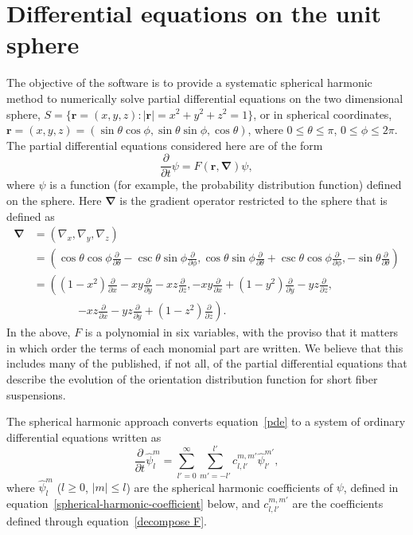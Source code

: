 \documentclass{amsart}
\newcommand\br{{\mathbf r}}
\newcommand\bnabla{{\boldsymbol \nabla}}
\begin{document}
\section{Differential equations on the unit sphere}

The objective of the software is to provide a systematic spherical harmonic method to numerically solve partial differential equations on the two
dimensional sphere, $S = \{\br = (x,y,z):|\br| = x^2+y^2+z^2 = 1\}$, or in spherical coordinates, $\br = (x,y,z) = (\sin\theta
\cos\phi,\sin\theta\sin\phi,\cos\theta)$, where $0\le\theta\le\pi$, $0\le\phi\le2\pi$.  The partial differential equations considered here are of the
form
\begin{equation}
\label{pde}
\frac\partial{\partial t}\psi = F(\br,\bnabla) \psi,
\end{equation}
where $\psi$ is a function (for example, the probability distribution function) defined on the sphere. Here $\bnabla$ is the gradient operator
restricted to the sphere that is defined as
\begin{equation}
\begin{split}
\bnabla &= (\nabla_x,\nabla_y,\nabla_z) \\
&= \left(\cos\theta\cos\phi\frac{\partial}{\partial\theta} - \csc\theta\sin\phi \frac{\partial}{\partial\phi},\cos\theta\sin\phi\frac{\partial}{\partial\theta} + \csc\theta\cos\phi \frac{\partial}{\partial\phi},-\sin\theta\frac{\partial}{\partial\theta} \right) \\
&= \left((1-x^2)\frac\partial{\partial x}-xy\frac\partial{\partial y}-xz\frac\partial{\partial z},
         -xy\frac\partial{\partial x}+(1-y^2)\frac\partial{\partial y}-yz\frac\partial{\partial z},\right.\\
&\qquad\qquad\left.
         -xz\frac\partial{\partial x}-yz\frac\partial{\partial y}+(1-z^2)\frac\partial{\partial
         z}\right) .
\end{split}
\end{equation}
In the above, $F$ is a polynomial in six variables, with the proviso that it matters in which order the terms of each monomial part are written. We
believe that this includes many of the published, if not all, of the partial differential equations that describe the evolution of
the orientation distribution function for short fiber suspensions.

The spherical harmonic approach converts equation~\eqref{pde} to a
system of ordinary differential equations written as
\begin{equation}
\label{spherical-pde}
\frac\partial{\partial t} \hat\psi_l^m = \sum_{l'=0}^\infty \sum_{m'=-l'}^{l'} c_{l,l'}^{m,m'} \hat\psi_{l'}^{m'} ,
\end{equation}
where $\hat\psi_l^m$ ($l \ge 0$, $|m| \le l$) are the spherical harmonic coefficients of $\psi$, defined in
equation~\eqref{spherical-harmonic-coefficient} below, and $c_{l,l'}^{m,m'}$ are the coefficients defined through equation~\eqref{decompose F}.
\end{document}
